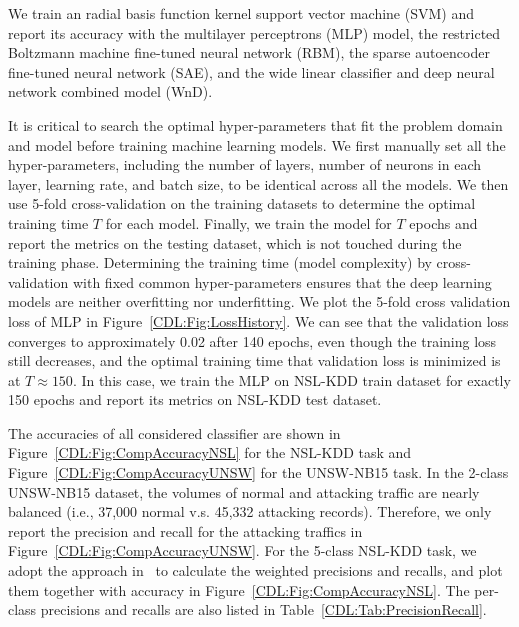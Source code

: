 We train an radial basis function kernel support vector machine (SVM) %
and report its accuracy with the multilayer perceptrons (MLP) model,
the restricted Boltzmann machine fine-tuned neural network (RBM),
the sparse autoencoder fine-tuned neural network (SAE),
and the wide linear classifier and deep neural network combined model (WnD).

It is critical to search the optimal hyper-parameters that fit the problem domain and model before training machine learning models. We first manually set all the hyper-parameters, including the number of layers, number of neurons in each layer, learning rate, and batch size, to be identical across all the models.
We then use 5-fold cross-validation on the training datasets to determine the optimal training time $T$
for each model.
Finally, we train the model for $T$ epochs and report the metrics on the testing dataset,
which is not touched during the training phase.
Determining the training time (model complexity) by cross-validation with fixed common hyper-parameters
ensures that the deep learning models are neither overfitting nor underfitting.
We plot the 5-fold cross validation loss of MLP in Figure~\ref{CDL:Fig:LossHistory}.
We can see that the validation loss converges to approximately 0.02 after 140 epochs, even though the training loss still decreases,
and the optimal training time that validation loss is minimized is at $T \approx 150$.
In this case, we train the MLP on NSL-KDD train dataset for exactly 150 epochs and report its metrics on NSL-KDD test dataset.

The accuracies of all considered classifier are shown in Figure~\ref{CDL:Fig:CompAccuracyNSL} for the NSL-KDD task and
Figure~\ref{CDL:Fig:CompAccuracyUNSW} for the UNSW-NB15 task.
In the 2-class UNSW-NB15 dataset,
the volumes of normal and attacking traffic are nearly balanced (i.e., 37,000 normal v.s. 45,332 attacking records).
Therefore, we only report the precision and recall for the attacking traffics in Figure~\ref{CDL:Fig:CompAccuracyUNSW}.
For the 5-class NSL-KDD task, we adopt the approach in~\cite{STL-NIDS}
to calculate the weighted precisions and recalls, and plot them together with accuracy in Figure~\ref{CDL:Fig:CompAccuracyNSL}.
The per-class precisions and recalls are also listed in Table~\ref{CDL:Tab:PrecisionRecall}.

